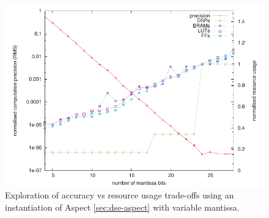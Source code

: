 \begin{figure}[!h]
\includegraphics[scale=0.7]{figs/pre}
\caption{Exploration of accuracy vs resource usage trade-offs using an
  instantiation of Aspect \ref{sec:dse-aspect} with variable
  mantissa.}
\label{fig:precision}
\end{figure}

